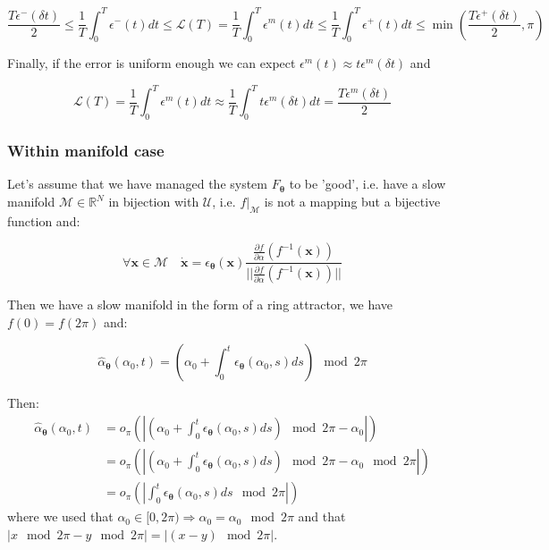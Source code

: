 \documentclass{article} %
\newcounter{ct}
\newcommand{\manifold}{\mathcal{M}}
\theoremstyle{definition}
\theoremstyle{remark}
\begin{document}
\begin{equation}
    \frac{T \epsilon^-(\delta t)}{2} \leq \frac{1}{T} \int_0^{T} \epsilon^-(t)dt \leq \mathcal{L}(T) = \frac{1}{T} \int_0^{T} \epsilon^{m}(t) dt \leq  \frac{1}{T} \int_0^{T} \epsilon^+(t) dt \leq \min \left( \frac{T \epsilon^+(\delta t)}{2}, \pi \right)
\end{equation}

Finally, if the error is uniform enough we can expect $\epsilon^{m}(t) \approx t\epsilon^m(\delta t)$ and

\begin{equation}
    \mathcal{L}(T) = \frac{1}{T} \int_0^{T} \epsilon^{m}(t) dt \approx  \frac{1}{T} \int_0^{T} t\epsilon^m(\delta t)dt = \frac{T \epsilon^m(\delta t)}{2}
\end{equation}

\subsubsection{Within manifold case}
Let's assume that we have managed the system $F_{\boldsymbol{\theta}}$ to be 'good', i.e. have a slow manifold $\manifold \in \mathbb{R}^N$ in bijection with $\mathcal{U}$, i.e. $f|_{\manifold}$ is not a mapping but a bijective function and:

\begin{equation}
\forall \bm{x} \in \manifold \quad \dot{\bm{x}} = \epsilon_{\bm{\theta}}(\bm{x})\frac{\frac{\partial f}{\partial \alpha}(f^{-1}(\bm{x}))}{||\frac{\partial f}{\partial \alpha}(f^{-1}(\bm{x}))||}
\end{equation}


Then we have a slow manifold in the form of a ring attractor, we have $f(0) = f(2 \pi)$ and:

\begin{equation}
    \hat{\alpha}_{\boldsymbol{\theta}}(\alpha_0, t) = \left(\alpha_0 + \int_0^t \epsilon_{\bm{\theta}}(\alpha_0, s) ds \right)\mod 2 \pi
\end{equation}


Then: 
\begin{equation}
\begin{split}
    \hat{\alpha}_{\boldsymbol{\theta}}(\alpha_0, t) &= o_\pi \left( \left| \left(\alpha_0 + \int_0^t \epsilon_{\bm{\theta}}(\alpha_0, s) ds \right)\mod 2 \pi - \alpha_0 \right| \right)  \\
    &= o_\pi \left( \left| \left(\alpha_0 + \int_0^t \epsilon_{\bm{\theta}}(\alpha_0, s) ds \right)\mod 2 \pi - \alpha_0 \mod 2 \pi \right| \right) \\
    &= o_\pi \left( \left| \int_0^t \epsilon_{\bm{\theta}}(\alpha_0, s) ds \mod 2 \pi \right| \right)
\end{split}
\end{equation}
where we used that $\alpha_0 \in [0,2 \pi) \Rightarrow \alpha_0 = \alpha_0 \mod 2 \pi$ and that $|x \mod 2 \pi - y \mod 2 \pi| = |(x-y) \mod 2 \pi|$.
\end{document}
